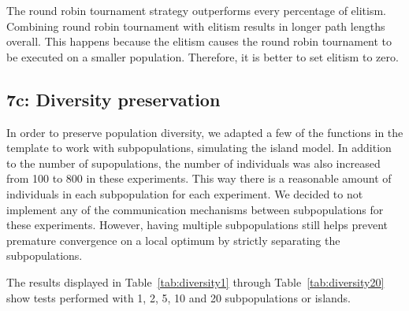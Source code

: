 \documentclass{report}
\begin{document}
The round robin tournament strategy outperforms every percentage of elitism. Combining round robin tournament with elitism results in longer path lengths overall. This happens because the elitism causes the round robin tournament to be executed on a smaller population. Therefore, it is better to set elitism to zero.


\subsection{7c: Diversity preservation}
In order to preserve population diversity, we adapted a few of the functions in the template to work with subpopulations, simulating the island model. In addition to the number of supopulations, the number of individuals was also increased from 100 to 800 in these experiments. This way there is a reasonable amount of individuals in each subpopulation for each experiment. We decided to not implement any of the communication mechanisms between subpopulations for these experiments. However, having multiple subpopulations still helps prevent premature convergence on a local optimum by strictly separating the subpopulations.

The results displayed in Table~\ref{tab:diversity1} through Table~\ref{tab:diversity20} show tests performed with 1, 2, 5, 10 and 20 subpopulations or islands.

\begin{table}[H]
	\centering
	\caption{Results when using a single subpopulation.}
	\label{tab:diversity1}
\end{table}
\end{document}
